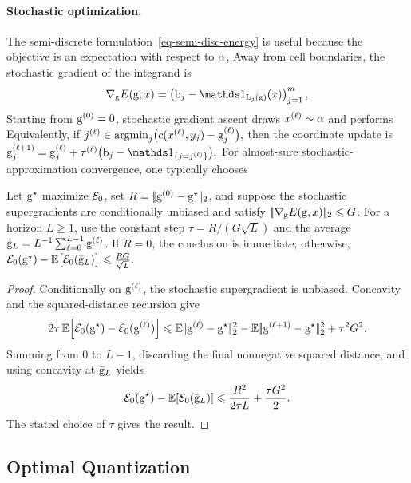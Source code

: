 \paragraph{Stochastic optimization.}
The semi-discrete formulation~\eqref{eq-semi-disc-energy} is useful because the objective is an expectation with respect to $\alpha$,
Away from cell boundaries, the stochastic gradient of the integrand is
\[
\nabla_{\gD}E(\gD,x)
=
\left(\b_j-\ones_{\Laguerre_j(\gD)}(x)\right)_{j=1}^m,
\]
Starting from $\mathrm{g}^{(0)}=0$, stochastic gradient ascent draws $x^{(\ell)}\sim\alpha$ and performs
Equivalently, if
\(j^{(\ell)}\in\operatorname{argmin}_j\bigl(c(x^{(\ell)},y_j)-\mathrm{g}_j^{(\ell)}\bigr),\)
then the coordinate update is \(\gD_j^{(\ell+1)} = \gD_j^{(\ell)} + \tau^{(\ell)}\bigl(\b_j-\ones_{\{j=j^{(\ell)}\}}\bigr).\)
For almost-sure stochastic-approximation convergence, one typically chooses
\begin{prop}\label{prop-semidiscrete-sgd-rate}
Let $\mathrm{g}^\star$ maximize $\mathcal{E}_0$, set $R=|\!| \mathrm{g}^{(0)}-\mathrm{g}^\star |\!|_2$, and suppose the stochastic supergradients are conditionally unbiased and satisfy $|\!| \nabla_{\mathrm{g}} E(\mathrm{g},x) |\!|_2\leqslant G$. For a horizon $L\geq1$, use the constant step $\tau=R/(G\sqrt L)$ and the average $\bar{\mathrm{g}}_L=L^{-1}\sum_{\ell=0}^{L-1}\mathrm{g}^{(\ell)}$. If $R=0$, the conclusion is immediate; otherwise,
\(\mathcal{E}_0(\mathrm{g}^\star)-\mathbb{E}\bigl[\mathcal{E}_0(\bar{\mathrm{g}}_L)\bigr] \leqslant \frac{RG}{\sqrt L}.\)
\end{prop}
\begin{proof}
Conditionally on $\mathrm{g}^{(\ell)}$, the stochastic supergradient is unbiased. Concavity and the squared-distance recursion give
\[
2\tau\,\mathbb{E}\!\left[\mathcal{E}_0(\mathrm{g}^\star)-\mathcal{E}_0(\mathrm{g}^{(\ell)})\right]
\leqslant
\mathbb{E}|\!| \mathrm{g}^{(\ell)}-\mathrm{g}^\star |\!|_2^2
-
\mathbb{E}|\!| \mathrm{g}^{(\ell+1)}-\mathrm{g}^\star |\!|_2^2
+
\tau^2G^2.
\]
Summing from $0$ to $L-1$, discarding the final nonnegative squared distance, and using concavity at $\bar{\mathrm{g}}_L$ yields
\[
\mathcal{E}_0(\mathrm{g}^\star)-\mathbb{E}\!\left[\mathcal{E}_0(\bar{\mathrm{g}}_L)\right]
\leqslant
\frac{R^2}{2\tau L}+\frac{\tau G^2}{2}.
\]
The stated choice of $\tau$ gives the result.
\end{proof}
\subsection{Optimal Quantization}
\label{sec-optimal-quantization}
